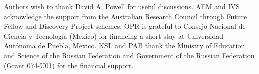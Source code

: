 \documentclass[twoside,twocolumn,9pt]{article}
\begin{document}
  Authors wish to thank David A. Powell for useful discussions.  AEM
  and IVS acknowledge the support from the Australian Research Council
  through Future Fellow and Discovery Project schemes. OPR is grateful
  to Consejo Nacional de Ciencia y Tecnolog\'{i}a (Mexico) for
  financing a short stay at Universidad Autónoma de Puebla, Mexico.
  KSL and PAB thank the Ministry of Education and Science of the
  Russian Federation and Government of the Russian Federation (Grant
  074-U01) for the financial support.











\balance


\scriptsize{

 } %
\end{document}
